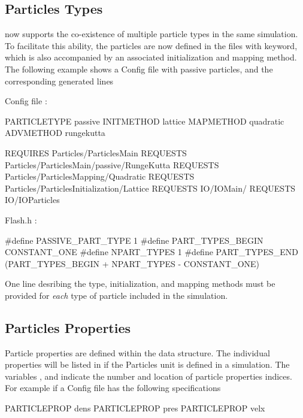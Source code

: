 \subsection{Particles Types}
\label{Sec:FlashHparttypes}
\flashx now supports the co-existence of multiple particle types
in the same simulation. To facilitate this ability, the particles are
now defined in the  files with 
keyword, which is also accompanied by an associated initialization and
mapping method. The following example shows a Config file with passive
particles, and the corresponding generated  lines
\begin{codeseg}

Config file :

PARTICLETYPE passive INITMETHOD lattice MAPMETHOD quadratic ADVMETHOD rungekutta

REQUIRES Particles/ParticlesMain
REQUESTS Particles/ParticlesMain/passive/RungeKutta
REQUESTS Particles/ParticlesMapping/Quadratic
REQUESTS Particles/ParticlesInitialization/Lattice
REQUESTS IO/IOMain/
REQUESTS IO/IOParticles

Flash.h :

#define PASSIVE_PART_TYPE 1
#define PART_TYPES_BEGIN CONSTANT_ONE
#define NPART_TYPES 1
#define PART_TYPES_END (PART_TYPES_BEGIN + NPART_TYPES - CONSTANT_ONE)

\end{codeseg} 

One line desribing the type, initialization, and mapping methods must be
provided for {\em each} type of particle included in the simulation.

\subsection {Particles Properties}
\label{Sec:FlashHpartprops}
Particle properties are defined within the  data structure.
The individual properties will be listed in  if the
\unit{Particles} unit is defined in a simulation.  The variables 
,  and 
indicate the number and location of particle properties indices.
For example if a Config file has the following specifications
\begin{codeseg}

PARTICLEPROP dens
PARTICLEPROP pres
PARTICLEPROP velx

\end{codeseg}


